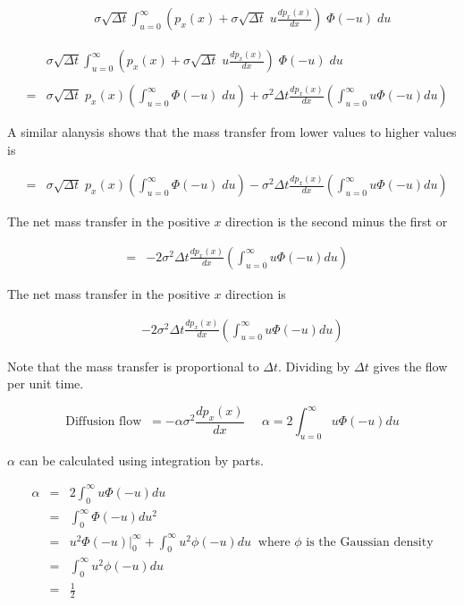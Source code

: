 {{\begin{eqnarray*}
&  & \sigma\sqrt{\Delta t} \int_{u = 0}^\infty \left(p_x(x)+\sigma\sqrt{\Delta t}\;u \frac{dp_x(x)}{dx}\right)\;\Phi(-u)\;du
\end{eqnarray*}
}

{\Large

\begin{eqnarray*}
&  & \sigma\sqrt{\Delta t} \int_{u = 0}^\infty \left(p_x(x)+\sigma\sqrt{\Delta t}\;u \frac{dp_x(x)}{dx}\right)\;\Phi(-u)\;du \\
\\
& = & \sigma\sqrt{\Delta t}\;p_x(x)\left(\int_{u=0}^\infty \Phi(-u)\;du\right) +  \sigma^2\Delta t \frac{dp_x(x)}{dx} \left(\int_{u=0}^\infty u\Phi(-u) du\right)
\end{eqnarray*}

A similar alanysis shows that the mass transfer from lower values to higher values is

\begin{eqnarray*}
& = & \sigma\sqrt{\Delta t}\;p_x(x)\left(\int_{u=0}^\infty \Phi(-u)\;du\right) -  \sigma^2\Delta t \frac{dp_x(x)}{dx} \left(\int_{u=0}^\infty u\Phi(-u) du\right)
\end{eqnarray*}

\vfill
The net mass transfer in the positive $x$ direction is the second minus the first or

\begin{eqnarray*}
& = & - 2\sigma^2\Delta t \frac{dp_x(x)}{dx} \left(\int_{u=0}^\infty u\Phi(-u) du\right)
\end{eqnarray*}
}

{\Large

The net mass transfer in the positive $x$ direction is

\begin{eqnarray*}
& & - 2\sigma^2\Delta t \frac{dp_x(x)}{dx} \left(\int_{u=0}^\infty u\Phi(-u) du\right)
\end{eqnarray*}

\vfill
Note that the mass transfer is proportional to $\Delta t$.  Dividing by $\Delta t$ gives the flow per unit time.

\vfill
$$\mbox{Diffusion flow}\;\;= - \alpha \sigma^2 \frac{dp_x(x)}{dx}\;\;\;\;\;\alpha = 2\int_{u=0}^\infty u\Phi(-u) du$$

\vfill
$\alpha$ can be calculated using integration by parts.

\begin{eqnarray*}
\alpha & = & 2 \int_{0}^\infty u \Phi(-u)du \\
& = & \int_{0}^\infty \Phi(-u)du^2 \\
& = & u^2 \Phi(-u)|_{0}^{\infty}+\int_{0}^\infty u^2 \phi(-u)du \;\;\mbox{where $\phi$ is the Gaussian density} \\
& = & \int_{0}^\infty u^2 \phi(-u)du\\
& = & \frac{1}{2}
\end{eqnarray*}}

}

